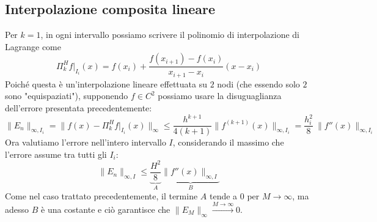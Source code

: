 \subsection{Interpolazione composita lineare}
Per $k=1$, in ogni intervallo possiamo scrivere il polinomio di interpolazione di Lagrange come
\begin{equation*}
    \Pi ^{H}_{k} f|_{I_i}(x)=f(x_i)+\frac{f(x_{i+1})-f(x_i)}{x_{i+1}-x_i}(x-x_i)
\end{equation*}
Poiché questa è un'interpolazione lineare effettuata su $2$ nodi (che essendo solo $2$ sono "equispaziati"), supponendo $f\in C^2$ possiamo usare la disuguaglianza dell'errore presentata precedentemente:
\begin{equation*}
    \|E_n\|_{\infty,I_i}=\|f(x)- \Pi ^{H}_{k} f|_{I_i}(x)\|_\infty \le \frac{h^{k+1}}{4(k+1)}\| \!f^{(k+1)}(x) \|_{\infty,I_i} = \frac{h_i^2}{8}\ \|f''(x)\|_{\infty,I_i}
\end{equation*}
Ora valutiamo l'errore nell'intero intervallo $I$, considerando il massimo che l'errore assume tra tutti gli $I_i$:
\begin{equation*}
    \|E_n\|_{\infty,I}\le \underbrace{\frac{H^2}8}_A \underbrace{\|f''(x)\|_{\infty,I}}_B
\end{equation*}
Come nel caso trattato precedentemente, il termine $A$ tende a $0$ per $M\to\infty$, ma adesso $B$ è una costante e ciò garantisce che $\|E_M\|_\infty \xrightarrow{M\to \infty}0$.
